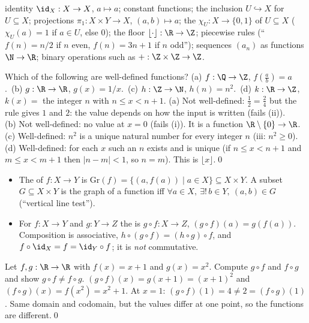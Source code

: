 \begin{key}
identity $\id_X:X\to X$, $a\mapsto a$; constant functions; the inclusion $U\hookrightarrow X$ for $U\subseteq X$; projections $\pi_1:X\times Y\to X$, $(a,b)\mapsto a$; the  $\chi_U:X\to\{0,1\}$ of $U\subseteq X$ ($\chi_U(a)=1$ if $a\in U$, else $0$); the floor $\lfloor\cdot\rfloor:\R\to\Z$; piecewise rules (``$f(n)=n/2$ if $n$ even, $f(n)=3n+1$ if $n$ odd''); sequences $(a_n)$ as functions $\N\to\R$; binary operations such as $+:\Z\times\Z\to\Z$.
\end{key}

\begin{hexample}
Which of the following are well-defined functions? (a) $f:\Q\to\Z$, $f(\frac ab)=a$.\ (b) $g:\R\to\R$, $g(x)=1/x$.\ (c) $h:\Z\to\N$, $h(n)=n^2$.\ (d) $k:\R\to\Z$, $k(x)=$ the integer $n$ with $n\le x<n+1$.
\solution
(a) Not well-defined: $\frac12=\frac24$ but the rule gives $1$ and $2$: the value depends on how the input is written (fails (ii)).\\
(b) Not well-defined: no value at $x=0$ (fails (i)). It is a function $\R\setminus\{0\}\to\R$.\\
(c) Well-defined: $n^2$ is a unique natural number for every integer $n$ (iii: $n^2\ge0$).\\
(d) Well-defined: for each $x$ such an $n$ exists and is unique (if $n\le x<n+1$ and $m\le x<m+1$ then $|n-m|<1$, so $n=m$). This is $\lfloor x\rfloor$.\qed
\end{hexample}

\begin{key}
\begin{itemize}
\item The  of $f:X\to Y$ is $\mathrm{Gr}(f)=\{(a,f(a))\mid a\in X\}\subseteq X\times Y$. A subset $G\subseteq X\times Y$ is the graph of a function iff $\forall a\in X,\ \exists!\,b\in Y,\ (a,b)\in G$ (``vertical line test'').
\item For $f:X\to Y$ and $g:Y\to Z$ the  is $g\circ f:X\to Z$, $(g\circ f)(a)=g(f(a))$. Composition is associative, $h\circ(g\circ f)=(h\circ g)\circ f$, and $f\circ\id_X=f=\id_Y\circ f$; it is \emph{not} commutative.
\end{itemize}
\end{key}

\begin{hexample}
Let $f,g:\R\to\R$ with $f(x)=x+1$ and $g(x)=x^2$. Compute $g\circ f$ and $f\circ g$ and show $g\circ f\neq f\circ g$.
\solution
$(g\circ f)(x)=g(x+1)=(x+1)^2$ and $(f\circ g)(x)=f(x^2)=x^2+1$. At $x=1$: $(g\circ f)(1)=4\neq2=(f\circ g)(1)$. Same domain and codomain, but the values differ at one point, so the functions are different.\qed
\end{hexample}

